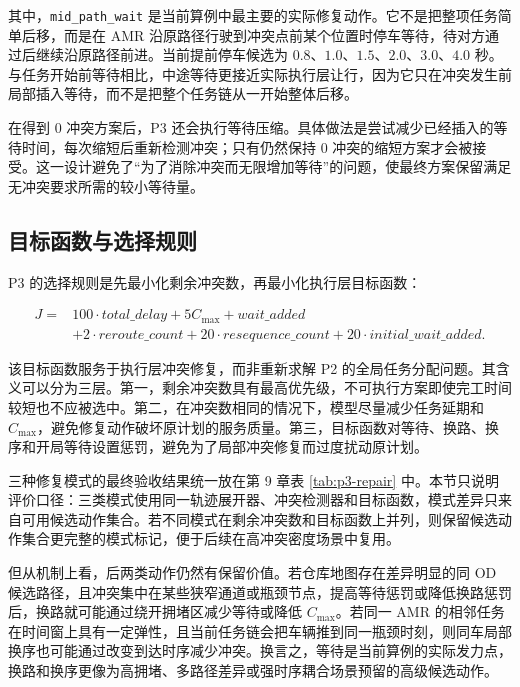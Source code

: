 其中，\verb|mid_path_wait| 是当前算例中最主要的实际修复动作。它不是把整项任务简单后移，而是在 AMR 沿原路径行驶到冲突点前某个位置时停车等待，待对方通过后继续沿原路径前进。当前提前停车候选为 $0.8$、$1.0$、$1.5$、$2.0$、$3.0$、$4.0$ 秒。与任务开始前等待相比，中途等待更接近实际执行层让行，因为它只在冲突发生前局部插入等待，而不是把整个任务链从一开始整体后移。

在得到 0 冲突方案后，P3 还会执行等待压缩。具体做法是尝试减少已经插入的等待时间，每次缩短后重新检测冲突；只有仍然保持 0 冲突的缩短方案才会被接受。这一设计避免了“为了消除冲突而无限增加等待”的问题，使最终方案保留满足无冲突要求所需的较小等待量。

\subsection{目标函数与选择规则}

P3 的选择规则是先最小化剩余冲突数，再最小化执行层目标函数：

\[
\begin{aligned}
J={}&100\cdot total\_delay+5C_{\max}+wait\_added\\
&+2\cdot reroute\_count+20\cdot resequence\_count
+20\cdot initial\_wait\_added.
\end{aligned}
\]

该目标函数服务于执行层冲突修复，而非重新求解 P2 的全局任务分配问题。其含义可以分为三层。第一，剩余冲突数具有最高优先级，不可执行方案即使完工时间较短也不应被选中。第二，在冲突数相同的情况下，模型尽量减少任务延期和 $C_{\max}$，避免修复动作破坏原计划的服务质量。第三，目标函数对等待、换路、换序和开局等待设置惩罚，避免为了局部冲突修复而过度扰动原计划。

三种修复模式的最终验收结果统一放在第 9 章表 \ref{tab:p3-repair} 中。本节只说明评价口径：三类模式使用同一轨迹展开器、冲突检测器和目标函数，模式差异只来自可用候选动作集合。若不同模式在剩余冲突数和目标函数上并列，则保留候选动作集合更完整的模式标记，便于后续在高冲突密度场景中复用。

但从机制上看，后两类动作仍然有保留价值。若仓库地图存在差异明显的同 OD 候选路径，且冲突集中在某些狭窄通道或瓶颈节点，提高等待惩罚或降低换路惩罚后，换路就可能通过绕开拥堵区减少等待或降低 $C_{\max}$。若同一 AMR 的相邻任务在时间窗上具有一定弹性，且当前任务链会把车辆推到同一瓶颈时刻，则同车局部换序也可能通过改变到达时序减少冲突。换言之，等待是当前算例的实际发力点，换路和换序更像为高拥堵、多路径差异或强时序耦合场景预留的高级候选动作。



